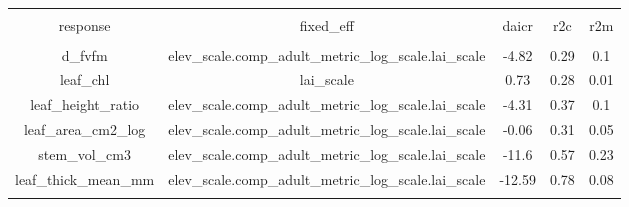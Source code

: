 
\begin{table}[!htbp] \centering 
  \caption{} 
  \label{best_mod_multi_output} 
\begin{tabular}{@{\extracolsep{5pt}} ccccc} 
\\[-1.8ex]\hline 
\hline \\[-1.8ex] 
response & fixed\_eff & daicr & r2c & r2m \\ 
\hline \\[-1.8ex] 
d\_fvfm & elev\_scale.comp\_adult\_metric\_log\_scale.lai\_scale & -4.82 & 0.29 & 0.1 \\ 
leaf\_chl & lai\_scale & 0.73 & 0.28 & 0.01 \\ 
leaf\_height\_ratio & elev\_scale.comp\_adult\_metric\_log\_scale.lai\_scale & -4.31 & 0.37 & 0.1 \\ 
leaf\_area\_cm2\_log & elev\_scale.comp\_adult\_metric\_log\_scale.lai\_scale & -0.06 & 0.31 & 0.05 \\ 
stem\_vol\_cm3 & elev\_scale.comp\_adult\_metric\_log\_scale.lai\_scale & -11.6 & 0.57 & 0.23 \\ 
leaf\_thick\_mean\_mm & elev\_scale.comp\_adult\_metric\_log\_scale.lai\_scale & -12.59 & 0.78 & 0.08 \\ 
\hline \\[-1.8ex] 
\end{tabular} 
\end{table} 
